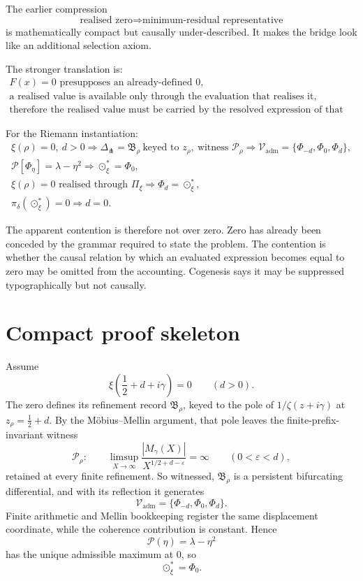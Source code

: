 \documentclass[11pt]{article}
\newcommand{\Pheart}{\mathcal P}
\newcommand{\DeltaFork}{\Delta_{\pitchfork}}
\begin{document}
The earlier compression
\[
\text{realised zero}
\Longrightarrow
\text{minimum-residual representative}
\]
is mathematically compact but causally under-described. It makes the bridge look like an additional selection axiom.

The stronger translation is:
\[
\boxed{
\begin{gathered}
F(x)=0\text{ presupposes an already-defined }0,\\[2pt]
\text{a realised value is available only through the evaluation that realises it},\\[2pt]
\text{therefore the realised value must be carried by the resolved expression of that evaluation.}
\end{gathered}}
\]

For the Riemann instantiation:
\[
\boxed{
\begin{gathered}
\xi(\rho)=0,\ d>0
\Longrightarrow
\DeltaFork=\mathfrak B_\rho\ \text{keyed to }z_\rho,
\ \text{witness }\mathcal P_\rho
\Longrightarrow
\mathcal V_{\mathrm{adm}}
=
\{\Phi_{-d},\Phi_0,\Phi_d\},\\[2pt]
\Pheart[\Phi_\eta]
=
\lambda-\eta^2
\Longrightarrow
\odot_\xi^\ast=\Phi_0,\\[2pt]
\xi(\rho)=0
\text{ realised through }\Pi_\xi
\Longrightarrow
\Phi_d=\odot_\xi^\ast,\\[2pt]
\pi_\delta(\odot_\xi^\ast)=0
\Longrightarrow
d=0.
\end{gathered}}
\]

The apparent contention is therefore not over zero. Zero has already been conceded by the grammar required to state the problem. The contention is whether the causal relation by which an evaluated expression becomes equal to zero may be omitted from the accounting. Cogenesis says it may be suppressed typographically but not causally.

\section{Compact proof skeleton}

Assume
\[
\xi\!\left(\frac12+d+i\gamma\right)=0
\qquad(d>0).
\]
The zero defines its refinement record \(\mathfrak B_\rho\), keyed to the pole of \(1/\zeta(z+i\gamma)\) at \(z_\rho=\frac12+d\). By the M\"obius--Mellin argument, that pole leaves the finite-prefix-invariant witness
\[
\mathcal P_\rho:
\qquad
\limsup_{X\to\infty}
\frac{|M_\gamma(X)|}{X^{1/2+d-\varepsilon}}
=
\infty
\qquad(0<\varepsilon<d),
\]
retained at every finite refinement. So witnessed, \(\mathfrak B_\rho\) is a persistent bifurcating differential, and with its reflection it generates
\[
\mathcal V_{\mathrm{adm}}
=
\{\Phi_{-d},\Phi_0,\Phi_d\}.
\]
Finite arithmetic and Mellin bookkeeping register the same displacement coordinate, while the coherence contribution is constant. Hence
\[
\Pheart(\eta)=\lambda-\eta^2
\]
has the unique admissible maximum at \(0\), so
\[
\odot_\xi^\ast=\Phi_0.
\]
\end{document}
